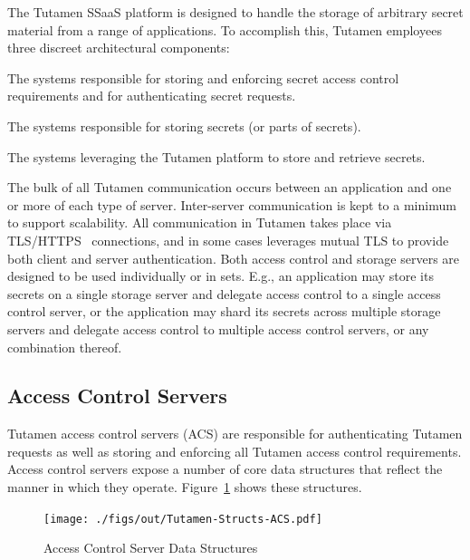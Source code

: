 The Tutamen SSaaS platform is designed to handle the storage of
arbitrary secret material from a range of applications. To accomplish
this, Tutamen employees three discreet architectural components:

\begin{packed_desc}
\item[Access Control Servers (ACS):] The systems responsible for
  storing and enforcing secret access control requirements and for
  authenticating secret requests.
\item[Storage Servers (SS):] The systems responsible for storing
  secrets (or parts of secrets).
\item[Applications:] The systems leveraging the Tutamen platform to
  store and retrieve secrets.
\end{packed_desc}

The bulk of all Tutamen communication occurs between an application
and one or more of each type of server. Inter-server communication is
kept to a minimum to support scalability. All communication in Tutamen
takes place via TLS/HTTPS~\cite{dierks2008} connections, and in some
cases leverages mutual TLS to provide both client and server
authentication. Both access control and storage servers are designed
to be used individually or in sets. E.g., an application may store its
secrets on a single storage server and delegate access control to a
single access control server, or the application may shard its secrets
across multiple storage servers and delegate access control to
multiple access control servers, or any combination thereof.

\subsection{Access Control Servers}
\label{chap:tutamen:arch:acs}

Tutamen access control servers (ACS) are responsible for
authenticating Tutamen requests as well as storing and enforcing all
Tutamen access control requirements. Access control servers expose a
number of core data structures that reflect the manner in which they
operate. Figure~\ref{fig:tutamen:acstructs} shows these structures.

\begin{figure}[t]
  \centering
  \texttt{[image: ./figs/out/Tutamen-Structs-ACS.pdf]}
  \caption{Access Control Server Data Structures}
  \label{fig:tutamen:acstructs}
\end{figure}

